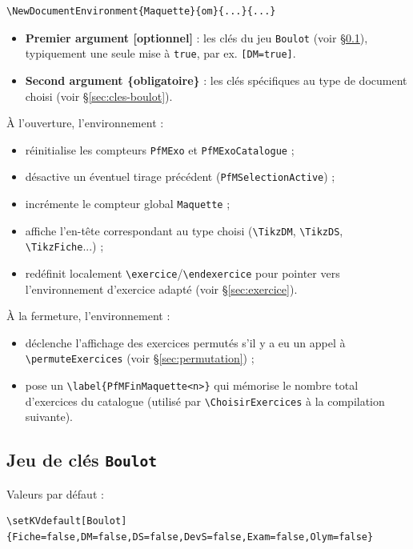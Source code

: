 \documentclass[11pt,a4paper]{article}
\newcommand{\cmdname}[1]{\texttt{\textbackslash#1}}
\begin{document}
\begin{lstlisting}
\NewDocumentEnvironment{Maquette}{om}{...}{...}
\end{lstlisting}

\begin{itemize}
  \item \textbf{Premier argument [optionnel]} : les clés du jeu \texttt{Boulot} (voir \S\ref{sec:boulot}), typiquement une seule mise à \texttt{true}, par ex. \texttt{[DM=true]}.
  \item \textbf{Second argument \{obligatoire\}} : les clés spécifiques au type de document choisi (voir \S\ref{sec:cles-boulot}).
\end{itemize}

À l'ouverture, l'environnement :
\begin{itemize}
  \item réinitialise les compteurs \texttt{PfMExo} et \texttt{PfMExoCatalogue} ;
  \item désactive un éventuel tirage précédent (\texttt{PfMSelectionActive}) ;
  \item incrémente le compteur global \texttt{Maquette} ;
  \item affiche l'en-tête correspondant au type choisi (\cmdname{TikzDM}, \cmdname{TikzDS}, \cmdname{TikzFiche}...) ;
  \item redéfinit localement \cmdname{exercice}/\cmdname{endexercice} pour pointer vers l'environnement d'exercice adapté (voir \S\ref{sec:exercice}).
\end{itemize}

À la fermeture, l'environnement :
\begin{itemize}
  \item déclenche l'affichage des exercices permutés s'il y a eu un appel à \cmdname{permuteExercices} (voir \S\ref{sec:permutation}) ;
  \item pose un \cmdname{label\{PfMFinMaquette<n>\}} qui mémorise le nombre total d'exercices du catalogue (utilisé par \cmdname{ChoisirExercices} à la compilation suivante).
\end{itemize}

\subsection{Jeu de clés \texttt{Boulot}}
\label{sec:boulot}

Valeurs par défaut :

\begin{lstlisting}
\setKVdefault[Boulot]{Fiche=false,DM=false,DS=false,DevS=false,Exam=false,Olym=false}
\end{lstlisting}
\end{document}
